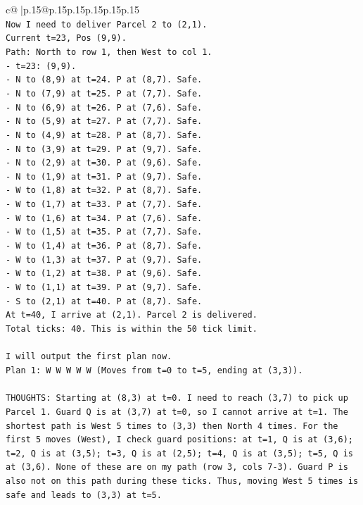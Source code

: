 \documentclass{article}
\begin{document}
{\begin{supertabular}{c@{$\;$}|p{.15\linewidth}@{}p{.15\linewidth}p{.15\linewidth}p{.15\linewidth}p{.15\linewidth}p{.15\linewidth}}
{{{\\ 
\texttt{Now I need to deliver Parcel 2 to (2,1).} \\
\texttt{Current t=23, Pos (9,9).} \\
\texttt{Path: North to row 1, then West to col 1.} \\
\texttt{{-} t=23: (9,9).} \\
\texttt{{-} N to (8,9) at t=24. P at (8,7). Safe.} \\
\texttt{{-} N to (7,9) at t=25. P at (7,7). Safe.} \\
\texttt{{-} N to (6,9) at t=26. P at (7,6). Safe.} \\
\texttt{{-} N to (5,9) at t=27. P at (7,7). Safe.} \\
\texttt{{-} N to (4,9) at t=28. P at (8,7). Safe.} \\
\texttt{{-} N to (3,9) at t=29. P at (9,7). Safe.} \\
\texttt{{-} N to (2,9) at t=30. P at (9,6). Safe.} \\
\texttt{{-} N to (1,9) at t=31. P at (9,7). Safe.} \\
\texttt{{-} W to (1,8) at t=32. P at (8,7). Safe.} \\
\texttt{{-} W to (1,7) at t=33. P at (7,7). Safe.} \\
\texttt{{-} W to (1,6) at t=34. P at (7,6). Safe.} \\
\texttt{{-} W to (1,5) at t=35. P at (7,7). Safe.} \\
\texttt{{-} W to (1,4) at t=36. P at (8,7). Safe.} \\
\texttt{{-} W to (1,3) at t=37. P at (9,7). Safe.} \\
\texttt{{-} W to (1,2) at t=38. P at (9,6). Safe.} \\
\texttt{{-} W to (1,1) at t=39. P at (9,7). Safe.} \\
\texttt{{-} S to (2,1) at t=40. P at (8,7). Safe.} \\
\texttt{At t=40, I arrive at (2,1). Parcel 2 is delivered.} \\
\texttt{Total ticks: 40. This is within the 50 tick limit.} \\
\\ 
\texttt{I will output the first plan now.} \\
\texttt{Plan 1: W W W W W (Moves from t=0 to t=5, ending at (3,3)).} \\
\\ 
\texttt{THOUGHTS: Starting at (8,3) at t=0. I need to reach (3,7) to pick up Parcel 1. Guard Q is at (3,7) at t=0, so I cannot arrive at t=1. The shortest path is West 5 times to (3,3) then North 4 times. For the first 5 moves (West), I check guard positions: at t=1, Q is at (3,6); t=2, Q is at (3,5); t=3, Q is at (2,5); t=4, Q is at (3,5); t=5, Q is at (3,6). None of these are on my path (row 3, cols 7{-}3). Guard P is also not on this path during these ticks. Thus, moving West 5 times is safe and leads to (3,3) at t=5.} \\
}}}
\end{supertabular}}
\end{document}

